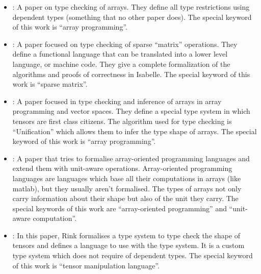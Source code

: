 \begin{itemize}
\item
  \textcite{trojahner_dependently_2009}: A paper on type checking of
  arrays. They define all type restrictions using dependent types
  (something that no other paper does). The special keyword of this work
  is \enquote{array programming}.
\item
  \textcite{arnold_specifying_2010}: A paper focused on type checking of
  sparse \enquote{matrix} operations. They define a functional language
  that can be translated into a lower level language, or machine code.
  They give a complete formalization of the algorithms and proofs of
  correctness in Isabelle. The special keyword of this work is
  \enquote{sparse matrix}.
\item
  \textcite{griffioen_type_2015}: A paper focused in type checking and
  inference of arrays in array programming and vector spaces. They
  define a special type system in which tensors are first class
  citizens. The algorithm used for type checking is
  \enquote{Unification} which allows them to infer the type shape of
  arrays. The special keyword of this work is \enquote{array
  programming}.
\item
  \textcite{slepak_array-oriented_2014}: A paper that tries to formalise
  array-oriented programming languages and extend them with unit-aware
  operations. Array-oriented programming languages are languages which
  base all their computations in arrays (like matlab), but they usually
  aren't formalised. The types of arrays not only carry information
  about their shape but also of the unit they carry. The special
  keywords of this work are \enquote{array-oriented programming} and
  \enquote{unit-aware computation}.
\item
  \textcite{rink_modeling_2018}: In this paper, Rink formalises a type
  system to type check the shape of tensors and defines a language to
  use with the type system. It is a custom type system which does not
  require of dependent types. The special keyword of this work is
  \enquote{tensor manipulation language}.
\end{itemize}

